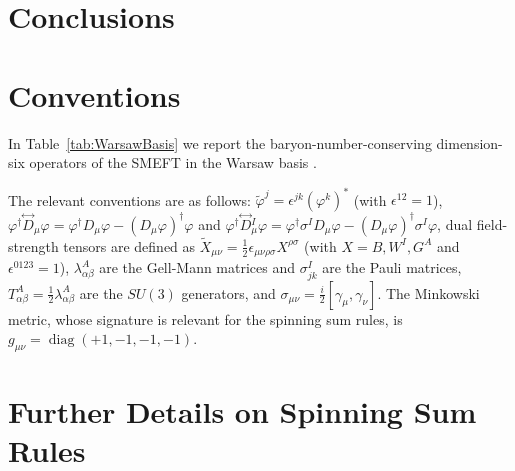 \section{Conclusions\label{sec:SMEFT_conclusions}}

\begin{subappendices}

\section{Conventions\label{app:SMEFT_conv}}
In Table~\ref{tab:WarsawBasis} we report the baryon-number-conserving dimension-six operators of the SMEFT in the Warsaw basis \cite{Grzadkowski:2010es}.
%


The relevant conventions are as follows: $\widetilde \varphi^j = \epsilon^{jk} (\varphi^k)^*$ (with $\epsilon^{12}=1$), $\varphi^\dagger \overset{\leftrightarrow}{D}{}_\mu \varphi = \varphi^\dagger D_\mu \varphi - (D_\mu \varphi)^\dagger \varphi$ and $\varphi^\dagger \overset{\leftrightarrow}{D}{}_\mu^I \varphi = \varphi^\dagger \sigma^I D_\mu \varphi - (D_\mu \varphi)^\dagger \sigma^I \varphi$, dual field-strength tensors are defined as $\widetilde X_{\mu\nu} = \frac{1}{2}\epsilon_{\mu\nu\rho\sigma}X^{\rho\sigma}$ (with $X=B,W^I,G^A$ and $\epsilon^{0123} = 1$), $\lambda^A_{\alpha\beta}$ are the Gell-Mann matrices and $\sigma^I_{jk}$ are the Pauli matrices, $T_{\alpha\beta}^A = \frac{1}{2}\lambda^A_{\alpha\beta}$ are the $SU(3)$ generators, and $\sigma_{\mu\nu} = \frac{i}{2}[\gamma_\mu,\gamma_\nu]$.
The Minkowski metric, whose signature is relevant for the spinning sum rules, is $g_{\mu\nu} = \operatorname{diag}(+1,-1,-1,-1)$.

\section{Further Details on Spinning Sum Rules\label{app: sum rules}}


\end{subappendices}
